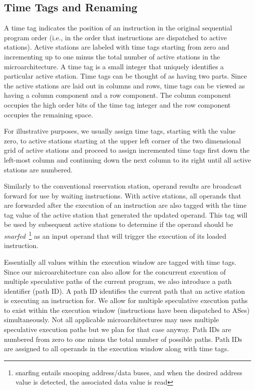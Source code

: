 \documentclass[10pt,dvips]{article}
\begin{document}
\subsection{Time Tags and Renaming}
%
A time tag indicates
the position of an instruction in the original 
sequential program order (i.e., in the order that instructions are 
dispatched
to active stations).  
Active stations are labeled with time tags starting
from zero and incrementing up to one minus the total number of
active stations in the microarchitecture.  
A time tag is a small
integer that uniquely identifies a particular active station.
Time tags can be thought of as having two
parts.  Since the active stations are laid out
in columns and rows, time tags can be viewed as having a column
component and a row component.  The column component 
occupies the high order bits of
the time tag integer and the row component occupies the remaining space.

For illustrative purposes, we usually assign time tags, starting with the
value zero,
to active stations starting at the upper left corner of the two
dimensional grid of active stations and proceed to assign incremented
time tags first down the left-most column and continuing down the
next column to its right until all active stations are numbered.

Similarly to the conventional reservation station, operand results
are broadcast forward for use by waiting instructions.
With active stations, all operands that are forwarded after the execution
of an instruction are also tagged with the time tag value of the
active station that generated the updated operand.
This tag will be used by subsequent active stations to determine if
the operand should be {\em snarfed}~\footnote{snarfing entails snooping
address/data buses, and when the desired address value is detected, 
the associated data value is read} 
as an input operand that will trigger
the execution of its loaded instruction.

Essentially all values within the execution
window are tagged with time tags.
Since our microarchitecture can also allow for the concurrent
execution of multiple speculative paths of the current program,
we also introduce a path identifier (path ID).
A path ID 
identifies the current path that an active station 
is executing an instruction for.  
We allow for multiple speculative execution paths to
exist within the execution window (instructions have been
dispatched to ASes) simultaneously.
Not all applicable microarchitectures may uses multiple speculative
execution paths but we plan for that case anyway.
Path IDs are numbered from zero
to one minus the total number of possible paths.
Path IDs are assigned to all operands in the execution window
along with time tags.
\end{document}
